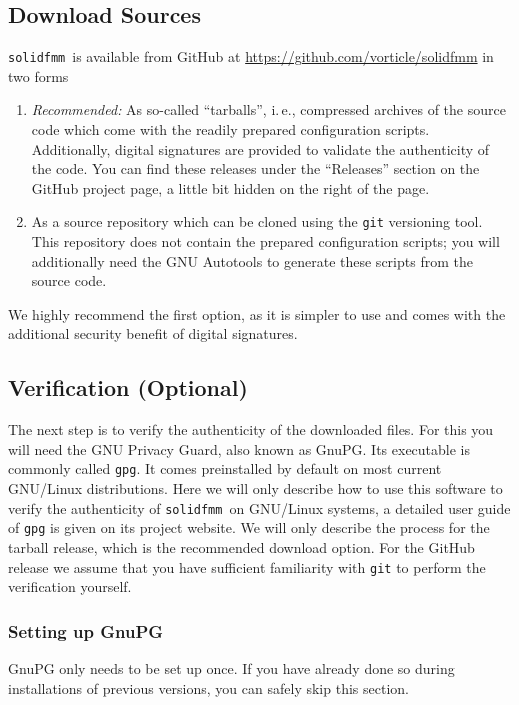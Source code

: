 \documentclass{scrbook}
\newcommand{\solidfmm}{\texttt{solidfmm}}
\begin{document}
\subsection{Download Sources}
\solidfmm\ is available from GitHub at
\url{https://github.com/vorticle/solidfmm} in two forms
\begin{enumerate}
\item\emph{Recommended:} As so-called \enquote{tarballs}, i.\,e., compressed
archives of the source code which come with the readily prepared configuration
scripts. Additionally, digital signatures are provided to validate the
authenticity of the code. You can find these releases under the
\enquote{Releases} section on the GitHub project page, a little bit hidden on
the right of the page.
\item As a source repository which can be cloned using the \lstinline|git| 
versioning tool. This repository does not contain the prepared configuration
scripts; you will additionally need the GNU Autotools to generate these
scripts from the source code.
\end{enumerate}

We highly recommend the first option, as it is simpler to use and comes with
the additional security benefit of digital signatures.

\subsection{Verification (Optional)}
The next step is to verify the authenticity of the downloaded files. For this
you will need the GNU Privacy Guard, also known as GnuPG.\autocite{gnupg} Its
executable is commonly called \lstinline|gpg|. It comes preinstalled by default
on most current GNU/Linux distributions. Here we will only describe how to use
this software to verify the authenticity of \solidfmm\ on GNU/Linux systems, a
detailed user guide of \lstinline|gpg| is given on its project website. We will
only describe the process for the tarball release, which is the recommended
download option. For the GitHub release we assume that you have sufficient
familiarity with \lstinline|git| to perform the verification yourself.


\subsubsection{Setting up GnuPG}
GnuPG only needs to be set up once. If you have already done so during
installations of previous versions, you can safely skip this section.
\end{document}
